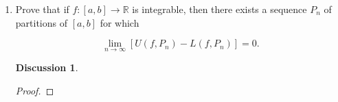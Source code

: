 \documentclass{article}
\theoremstyle{definition}
\theoremstyle{remark}
\theoremstyle{definition}
\newtheorem*{discussion}{Discussion}
\begin{document}
\begin{enumerate}[leftmargin=*]
\begin{proof}
    \noindent Therefore, 
    
    \begin{equation*}
        U(f+g,P)=2 < 2+x_{r+1}-x_r = U(f,P)+U(g,P).
    \end{equation*}
    
    \end{proof}
    
    \item Prove that if $f\colon[a,b]\rightarrow\mathbb{R}$ is integrable, then there exists a sequence $P_n$ of partitions of $[a,b]$ for which 
    
    \begin{equation*}
        \lim_{n\rightarrow\infty}[U(f,P_n)-L(f,P_n)]=0.
    \end{equation*}
    
    \begin{discussion}
        
    \end{discussion}
    
    \begin{proof}
    
    \end{proof}
    
\end{enumerate}
\end{document}
